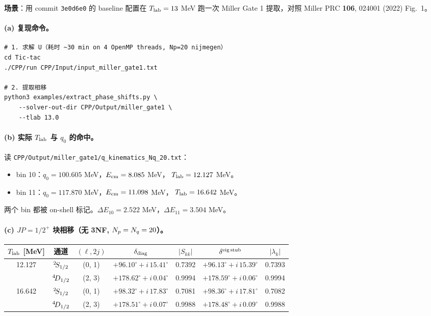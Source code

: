 \begin{numericalbox}[label={box:ch14-numerical-closure}]

\textbf{场景}：用 commit \texttt{3e0d6e0} 的 baseline 配置在 \({T_{\text{lab}}} = 13\) MeV
跑一次 Miller Gate 1 提取，对照 Miller PRC \textbf{106}, 024001 (2022) Fig.~1。

\paragraph{(a) 复现命令。}
\begin{lstlisting}[style=config]
# 1. 求解 U（耗时 ~30 min on 4 OpenMP threads, Np=20 nijmegen）
cd Tic-tac
./CPP/run CPP/Input/input_miller_gate1.txt

# 2. 提取相移
python3 examples/extract_phase_shifts.py \
    --solver-out-dir CPP/Output/miller_gate1 \
    --tlab 13.0
\end{lstlisting}

\paragraph{(b) 实际 \({T_{\text{lab}}}\) 与 \(q_0\) 的命中。}
读 \texttt{CPP/Output/miller\_gate1/q\_kinematics\_Nq\_20.txt}：
\begin{itemize}
  \item bin 10：\(q_0 = 100.605\) MeV，\(E_{\rm cm} = 8.085\) MeV，
        \({T_{\text{lab}}} = 12.127\) MeV。
  \item bin 11：\(q_0 = 117.870\) MeV，\(E_{\rm cm} = 11.098\) MeV，
        \({T_{\text{lab}}} = 16.642\) MeV。
\end{itemize}
两个 bin 都被 on-shell 标记。\(\Delta E_{10} = 2.522\) MeV，\(\Delta E_{11} =
3.504\) MeV。

\paragraph{(c) \(JP = 1/2^+\) 块相移（无 3NF, \(N_p = N_q = 20\)）。}

\begin{center}
\begin{tabular}{ccccccc}
\toprule
\({T_{\text{lab}}}\) [MeV] & 通道 & \((\ell, 2j)\) & \(\delta_{\rm diag}\) & \(|S_{kk}|\) &
\(\delta^{\rm eig\,stub}\) & \(|\lambda_k|\) \\
\midrule
\multirow{2}{*}{12.127}
  & \({}^{2}\!S_{1/2}\) & (0, 1) & \(+96.10^\circ + i\,15.41^\circ\)
  & 0.7392 & \(+96.13^\circ + i\,15.39^\circ\) & 0.7393 \\
  & \({}^{4}\!D_{1/2}\) & (2, 3) & \(+178.62^\circ + i\,0.04^\circ\)
  & 0.9994 & \(+178.59^\circ + i\,0.06^\circ\) & 0.9994 \\
\midrule
\multirow{2}{*}{16.642}
  & \({}^{2}\!S_{1/2}\) & (0, 1) & \(+98.32^\circ + i\,17.83^\circ\)
  & 0.7081 & \(+98.36^\circ + i\,17.81^\circ\) & 0.7082 \\
  & \({}^{4}\!D_{1/2}\) & (2, 3) & \(+178.51^\circ + i\,0.07^\circ\)
  & 0.9988 & \(+178.48^\circ + i\,0.09^\circ\) & 0.9988 \\
\bottomrule
\end{tabular}
\end{center}


\end{numericalbox}
